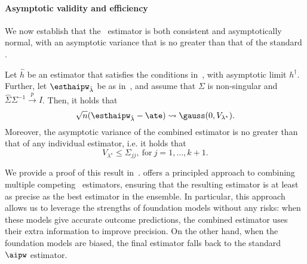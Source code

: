 




\paragraph{Asymptotic validity and efficiency}
We now establish that the \ours~estimator is both consistent and asymptotically normal, with an asymptotic variance that is no greater than that of the standard \aipw. 
\begin{theorem}
\label{thm:combine}
Let $\widehat h$ be an estimator that satisfies the conditions in~, with asymptotic limit $h^\dagger$. Further, let $\esthaipw_{\hat \lambda}$ be as in~, and assume that  $\Sigma$ is non-singular and $\widehat \Sigma\Sigma^{-1}\overset{p}{\to}I$. Then, it holds that 
$$
\sqrt n (\esthaipw_{\hat \lambda}   - \ate) \rightsquigarrow \gauss(0, V_{\lambda^\star}).
$$
Moreover, the asymptotic variance of the combined estimator is no greater than that of any individual estimator, i.e. it holds that 
$$
V_{\lambda^\star} \leq \Sigma_{jj}, ~\text{for}~j=1,\ldots,k+1.$$
\end{theorem}
We provide a proof of this result in~.
 offers a principled approach to combining multiple competing \aipw~estimators, ensuring that the resulting estimator is at least as precise as the best estimator in the ensemble. In particular, this approach allows us to leverage the strengths of foundation models without any risks: when these models give accurate outcome predictions, the combined estimator uses their extra information to improve precision. On the other hand, when the foundation models are biased, the final estimator falls back to the standard $\aipw$ estimator. 









